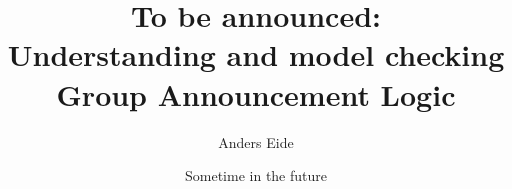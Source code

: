\author{Anders Eide}
\title{To be announced: \\\large Understanding and model checking Group Announcement Logic}
\date{Sometime in the future}

\maketitle
{}

\newpage
\tableofcontents

